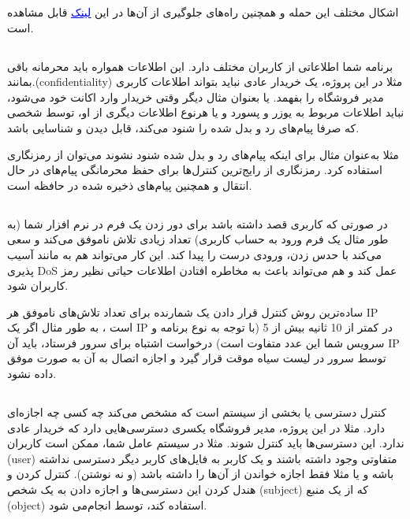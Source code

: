 \documentclass[]{article}
\begin{document}
اشکال مختلف این حمله و همچنین راه‌های جلوگیری از آن‌ها در این \href{https://hdivsecurity.com/owasp-broken-authentication}{\textcolor{blue}{\underline{لینک}}} قابل مشاهده است.




\subsection*{{}}
برنامه شما اطلاعاتی از کاربران مختلف دارد. این اطلاعات همواره باید محرمانه باقی بمانند.(confidentiality) مثلا در این پروژه، یک خریدار عادی نباید بتواند اطلاعات کاربری مدیر فروشگاه را بفهمد. یا بعنوان مثال دیگر وقتی خریدار وارد اکانت خود می‌شود،‌ نباید اطلاعات مربوط به یوزر و پسورد و یا هرنوع اطلاعات دیگری از او، توسط شخصی که صرفا پیام‌های رد و بدل شده را شنود می‌کند، قابل دیدن و شناسایی باشد. 

مثلا به‌عنوان مثال برای اینکه پیام‌های رد و بدل شده شنود نشوند می‌توان از رمزنگاری استفاده کرد. رمزنگاری از رایج‌ترین کنترل‌ها برای حفظ محرمانگی پیام‌های در حال انتقال و همچنین پیام‌های ذخیره شده در حافظه است.

\subsection*{{}}
در صورتی که کاربری قصد داشته باشد برای دور زدن یک فرم در نرم افزار شما (به طور مثال یک فرم ورود به حساب کاربری) تعداد زیادی تلاش ناموفق می‌کند و سعی می‌کند با حدس زدن، ورودی درست را پیدا کند. این کار می‌تواند هم به مانند آسیب پذیری DoS عمل کند و هم می‌تواند باعث به مخاطره افتادن اطلاعات حیاتی نظیر رمز کاربران شود.

\bigskip

ساده‌ترین روش کنترل قرار دادن یک شمارنده برای تعداد تلاش‌های ناموفق هر IP است ، به طور مثال اگر یک IP در کمتر از 10 ثانیه بیش از 5 (با توجه به نوع برنامه و سرویس شما این عدد متفاوت است) درخواست اشتباه برای سرور فرستاد، باید آن IP توسط سرور در لیست سیاه موقت قرار گیرد و اجازه اتصال به آن به صورت موفق داده نشود.

\subsection*{{}}
کنترل دسترسی یا  بخشی از سیستم است که مشخص می‌کند چه کسی چه اجازه‌ای دارد. مثلا در این پروژه، مدیر فروشگاه یکسری دسترسی‌هایی دارد که خریدار عادی ندارد. این دسترسی‌ها باید کنترل شوند. 
\bigskip
مثلا در سیستم عامل شما، ممکن است کاربران (user)‌ متفاوتی وجود داشته باشند و یک کاربر به فایل‌های کاربر دیگر دسترسی نداشته باشه و یا مثلا فقط اجازه خواندن از آن‌ها را داشته باشد (و نه نوشتن). کنترل کردن و هندل کردن این دسترسی‌ها و اجازه دادن به یک شخص (‌subject‌) که از یک منبع (‌object‌) استفاده کند،‌ توسط  انجام‌می شود. 
\end{document}
